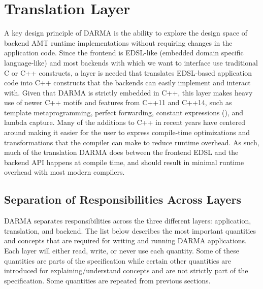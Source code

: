 
\chapter{Translation Layer}
\label{chap:translation_layer}

A key design principle of DARMA is the ability to explore the design space of
backend AMT runtime implementations without requiring changes in the application
code.  Since the frontend is EDSL-like (embedded domain specific language-like)
and most backends with which we want to interface use traditional C or C++
constructs, a layer is needed that translates EDSL-based application code into
C++ constructs that the backends can easily implement and interact with.  Given
that DARMA is strictly embedded in C++, this layer makes heavy use of newer C++
motifs and features from C++11 and C++14, such as template metaprogramming,
perfect forwarding, constant expressions (), and lambda
capture.  Many of the additions to C++ in recent years have centered around
making it easier for the user to express compile-time optimizations and
transformations that the compiler can make to reduce runtime overhead.  As such,
much of the translation DARMA does between the frontend EDSL and the backend API
happens at compile time, and should result in minimal runtime overhead with most
modern compilers.

\section{Separation of Responsibilities Across Layers}
DARMA separates responsibilities across the three different layers: application, translation, and backend.
The list below describes the most important quantities and concepts that are required for writing and running DARMA applications.
Each layer will either read, write, or never use each quantity.  
Some of these quantities are parts of the specification while certain other quantities are introduced for explaining/understand concepts and are not strictly part of the specification.
Some quantities are repeated from previous sections.

